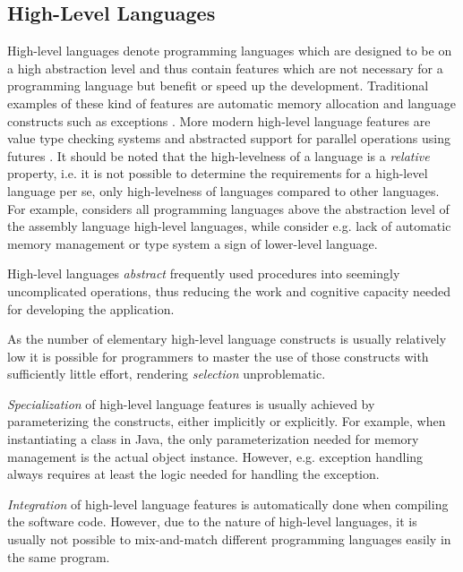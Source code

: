 \subsection{High-Level Languages}
High-level languages denote programming languages which are designed to be on a high abstraction level and thus contain features which are not necessary for a programming language but benefit or speed up the development. Traditional examples of these kind of features are automatic memory allocation \citep{krueger_software_1992} and language constructs such as exceptions \citep{mitchell_concepts_2003}. More modern high-level language features are value type checking systems and abstracted support for parallel operations using futures \citep{totoo_haskell_2012}. It should be noted that the high-levelness of a language is a \emph{relative} property, i.e. it is not possible to determine the requirements for a high-level language per se, only high-levelness of languages compared to other languages. For example, \citet{krueger_software_1992} considers all programming languages above the abstraction level of the assembly language high-level languages, while \citet{carro_high-level_2006} consider e.g. lack of automatic memory management or type system a sign of lower-level language.

High-level languages \emph{abstract} frequently used procedures into seemingly uncomplicated operations, thus reducing the work and cognitive capacity needed for developing the application. \citep[chap.~3]{krueger_software_1992}

As the number of elementary high-level language constructs is usually relatively low it is possible for programmers to master the use of those constructs with sufficiently little effort, rendering \emph{selection} unproblematic. \citep[chap.~3]{krueger_software_1992}

\emph{Specialization} of high-level language features is usually achieved by parameterizing the constructs, either implicitly or explicitly. For example, when instantiating a class in Java, the only parameterization needed for memory management is the actual object instance. However, e.g. exception handling always requires at least the logic needed for handling the exception. \citep[chap.~3]{krueger_software_1992}

\emph{Integration} of high-level language features is automatically done when compiling the software code. However, due to the nature of high-level languages, it is usually not possible to mix-and-match different programming languages easily in the same program. \citep[chap.~3]{krueger_software_1992}

